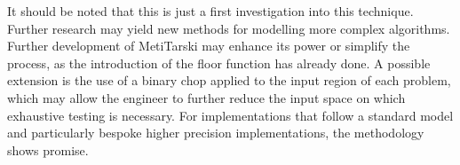 \documentclass[a4]{article}
\begin{document}
It should be noted that this is just a first investigation into this technique. Further research may yield new methods for modelling more complex algorithms. Further development of MetiTarski may enhance its power or simplify the process, as the introduction of the floor function has already done. A possible extension is the use of a binary chop applied to the input region of each problem, which may allow the engineer to further reduce the input space on which exhaustive testing is necessary. For implementations that follow a standard model and particularly bespoke higher precision implementations, the methodology shows promise.


\end{document}
